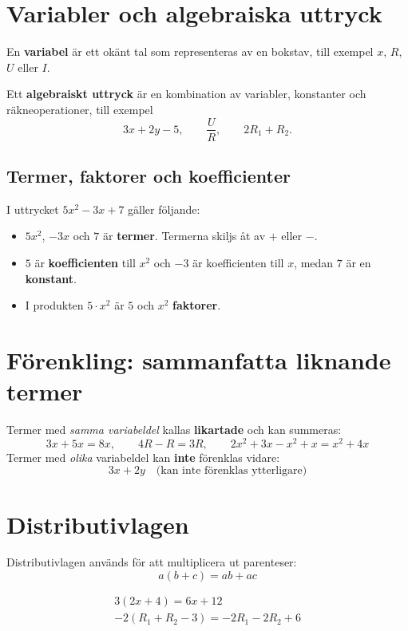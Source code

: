 
\section{Variabler och algebraiska uttryck}
\label{c2:sec:variabler}
En \textbf{variabel} är ett okänt tal som representeras av en bokstav, till exempel $x$, $R$, $U$
eller $I$.

Ett \textbf{algebraiskt uttryck} är en kombination av variabler, konstanter och räkneoperationer,
till exempel
\[
  3x + 2y - 5, \qquad \frac{U}{R}, \qquad 2R_1 + R_2.
\]

\subsection{Termer, faktorer och koefficienter}
\label{c2:sec:termer}
I uttrycket $5x^2 - 3x + 7$ gäller följande:
\begin{itemize}
  \item $5x^2$, $-3x$ och $7$ är \textbf{termer}. Termerna skiljs åt av $+$ eller $-$.
  \item $5$ är \textbf{koefficienten} till $x^2$ och $-3$ är koefficienten till $x$, medan $7$ är
    en \textbf{konstant}.
  \item I produkten $5 \cdot x^2$ är $5$ och $x^2$ \textbf{faktorer}.
\end{itemize}

\section{Förenkling: sammanfatta liknande termer}
\label{c2:sec:forenkling}
Termer med \emph{samma variabeldel} kallas \textbf{likartade} och kan summeras:
\[
  3x + 5x = 8x, \qquad 4R - R = 3R, \qquad 2x^2 + 3x - x^2 + x = x^2 + 4x
\]
Termer med \emph{olika} variabeldel kan \textbf{inte} förenklas vidare:
\[
  3x + 2y \quad \text{(kan inte förenklas ytterligare)}
\]

\section{Distributivlagen}
\label{c2:sec:distributiv}
Distributivlagen används för att multiplicera ut parenteser:
\[
  a(b + c) = ab + ac
\]

\begin{exempel}
\begin{gather*}
  3(2x + 4) = 6x + 12 \\
  -2(R_1 + R_2 - 3) = -2R_1 - 2R_2 + 6
\end{gather*}
\end{exempel}

